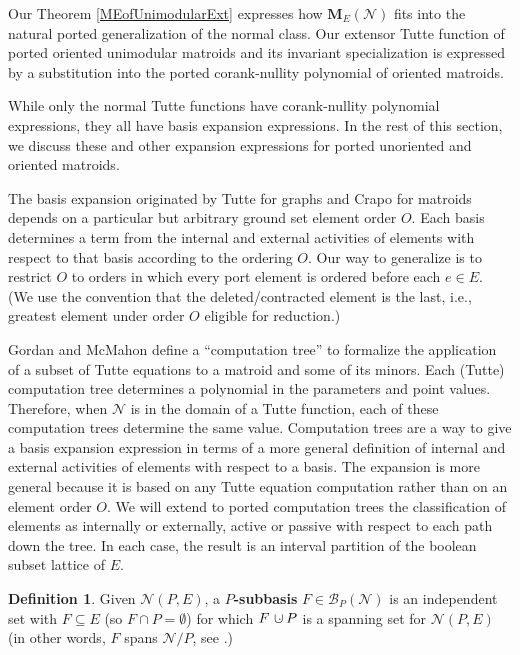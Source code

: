 \documentclass[12pt]{article}
\theoremstyle{definition}
\newtheorem{definition}[theorem]{Definition}
\newcommand{\dunion}
{\mbox{\hbox{\hskip6pt$\cdot$\hskip-5.50pt$\cup$\hskip2pt}}}
\newcommand{\ext}[1]{\ensuremath{\mathbf{#1}}}
\begin{document}
Our Theorem \ref{MEofUnimodularExt} expresses how
$\ext{M}_E(\mathcal{N})$ 
fits into the natural ported generalization of the
normal class.  Our extensor Tutte function of ported oriented 
unimodular matroids and its invariant specialization is expressed
by a substitution into the ported corank-nullity polynomial of
oriented matroids.

While only the normal Tutte functions have corank-nullity
polynomial expressions, they all have 
basis expansion expressions\cite{MR93a:05047}.
In the rest of this section, we discuss these and other
expansion expressions for ported unoriented and oriented matroids.

The basis expansion originated by Tutte\cite{TutteDich}
for graphs and Crapo\cite{CrapoAct} for matroids depends on 
a particular but arbitrary ground set element order $O$.
Each basis determines a term from the internal
and external activities of elements with respect to that basis
according to the ordering $O$.
Our way to generalize is to 
restrict $O$ to orders in which
every port element is ordered before 
each $e\in E$.  (We use the convention that the deleted/contracted element
is the last, i.e., greatest element under order $O$ eligible for reduction.)

Gordan and McMahon define\cite{GordonMcMachonGreedoid} 
a ``computation tree''
to formalize the application of a subset of Tutte equations
to a matroid and some of its minors.
Each (Tutte) computation
tree determines
a polynomial in the parameters and point values.
Therefore, when
$\mathcal{N}$ is in the domain of a Tutte function, each
of these computation trees determine the same value.  
Computation
trees are a way to give
a basis expansion expression in terms of 
a more 
general definition 
of internal and external activities of elements
with respect to a basis.  The expansion is more general because it
is based on any Tutte equation computation rather than on an element order $O$.
We will extend to ported computation trees the
classification\cite{GordonMcMachonGreedoid} of elements as internally or externally, 
active or passive
with respect to each path down the tree.
In each case, the result is an interval
partition of the boolean subset lattice of $E$.  

\begin{definition}
Given $\mathcal{N}(P,E)$,  a
\textbf{$P$-subbasis} $F\in \mathcal{B}_P(\mathcal{N})$
is an independent set  with $F\subseteq E$
(so $F\cap P=\emptyset$) for which $F\dunion P$ is a spanning set
for $\mathcal{N}(P,E)$ (in other words, $F$ spans $\mathcal{N}/P$,
see \cite{SetPointedLV}.)
\end{definition}
\end{document}
